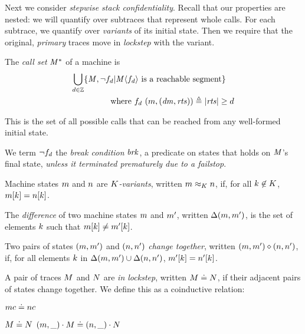 \documentclass[10pt,conference]{ieeetran}%
\theoremstyle{definition}
\begin{document}
{Next we consider {\em stepwise stack confidentiality}. Recall that our properties are
nested: we will quantify over subtraces that represent whole calls. For each
subtrace, we quantify over {\em variants} of its initial state. Then we require
that the original, {\em primary} traces move in {\em lockstep} with the variant.

 The \emph{call set} \(\mathit{M}^*\) of a machine is
\[\begin{aligned}
\bigcup_{d \in \mathbb{Z}} \{\mathit{M}, \neg f_d | \mathit{M}\langle f_d \rangle
\text{ is a reachable segment}\} \hspace{1em} \\
\text{where } f_d ~ (m,(\mathit{dm},\mathit{rts})) \triangleq |\mathit{rts}| \geq d \\
\end{aligned}\]

This is the set of all possible calls that can be reached from any well-formed initial state.

We term \(\neg f_d\) the {\em break condition} \(\mathit{brk}\), a predicate on
states that holds on \(\mathit{M}\)'s final state, {\em unless it terminated prematurely due to a failstop}.

 Machine states \(m\) and \(n\) are {\em \(K\)-variants},
written \(m \approx_K n\), if, for
all \(k \not \in K\), \(m[k] = n[k]\).

 The \emph{difference} of two machine states \(m\) and \(m'\), written \(\Delta(m,m')\),
is the set of elements \(k\)
such that \(m[k] \not = m'[k]\).

 Two pairs of states \((m,m')\) and \((n,n')\)
 {\em change together}, written \((m,m') \diamond (n,n')\), if, for all elements \(k\) in
\(\Delta(m,m') \cup \Delta(n,n')\),
\(m'[k] = n'[k]\).

 A pair of traces \(M\) and \(N\) are {\em in lockstep},
written \(M \doteq N\),
if their adjacent pairs of states change together.  We define this as a coinductive relation:

\smallskip
\begin{minipage}[b]{.2\columnwidth}
\judgment{}
         {\(mc \doteq nc\)}
\end{minipage}
\begin{minipage}[b]{.75\columnwidth}
\judgmenttwo{\(\mach, \pi_\mach(\head(\machT)) \diamond \nach, \pi_\mach(\head(\nachT))\)}
            {\(M \doteq N\)}
            {\((m,\relax{\_}) \cdot M \doteq (n,\relax{\_}) \cdot N\)}
\end{minipage}

}
\end{document}
